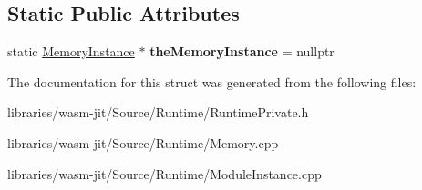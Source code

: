 \subsection*{Static Public Attributes}
\begin{DoxyCompactItemize}
\item 
\mbox{\label{struct_runtime_1_1_memory_instance_ace5e4a1cd8c289e211d1044d55b3b15e}} 
static \mbox{\hyperlink{struct_runtime_1_1_memory_instance}{Memory\+Instance}} $\ast$ {\bfseries the\+Memory\+Instance} = nullptr
\end{DoxyCompactItemize}


The documentation for this struct was generated from the following files\+:\begin{DoxyCompactItemize}
\item 
libraries/wasm-\/jit/\+Source/\+Runtime/Runtime\+Private.\+h\item 
libraries/wasm-\/jit/\+Source/\+Runtime/Memory.\+cpp\item 
libraries/wasm-\/jit/\+Source/\+Runtime/Module\+Instance.\+cpp\end{DoxyCompactItemize}
